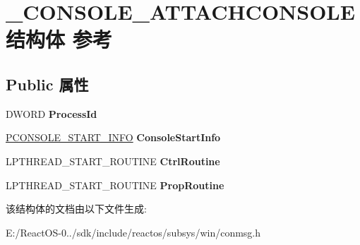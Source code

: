 \hypertarget{struct___c_o_n_s_o_l_e___a_t_t_a_c_h_c_o_n_s_o_l_e}{}\section{\+\_\+\+C\+O\+N\+S\+O\+L\+E\+\_\+\+A\+T\+T\+A\+C\+H\+C\+O\+N\+S\+O\+L\+E结构体 参考}
\label{struct___c_o_n_s_o_l_e___a_t_t_a_c_h_c_o_n_s_o_l_e}
\subsection*{Public 属性}
\begin{DoxyCompactItemize}
\item 
\mbox{\label{struct___c_o_n_s_o_l_e___a_t_t_a_c_h_c_o_n_s_o_l_e_a23c3387a096326a098b841b0dace6e54}} 
D\+W\+O\+RD {\bfseries Process\+Id}
\item 
\mbox{\label{struct___c_o_n_s_o_l_e___a_t_t_a_c_h_c_o_n_s_o_l_e_af6cd38d8953ae66032acd2c049c85659}} 
\hyperlink{struct___c_o_n_s_o_l_e___s_t_a_r_t___i_n_f_o}{P\+C\+O\+N\+S\+O\+L\+E\+\_\+\+S\+T\+A\+R\+T\+\_\+\+I\+N\+FO} {\bfseries Console\+Start\+Info}
\item 
\mbox{\label{struct___c_o_n_s_o_l_e___a_t_t_a_c_h_c_o_n_s_o_l_e_a8b13027dd88bb3e2c3939025f6ad155e}} 
L\+P\+T\+H\+R\+E\+A\+D\+\_\+\+S\+T\+A\+R\+T\+\_\+\+R\+O\+U\+T\+I\+NE {\bfseries Ctrl\+Routine}
\item 
\mbox{\label{struct___c_o_n_s_o_l_e___a_t_t_a_c_h_c_o_n_s_o_l_e_ab4e4e5f13a8c75d13f10ce46eb82d909}} 
L\+P\+T\+H\+R\+E\+A\+D\+\_\+\+S\+T\+A\+R\+T\+\_\+\+R\+O\+U\+T\+I\+NE {\bfseries Prop\+Routine}
\end{DoxyCompactItemize}


该结构体的文档由以下文件生成\+:\begin{DoxyCompactItemize}
\item 
E\+:/\+React\+O\+S-\/0../sdk/include/reactos/subsys/win/conmsg.\+h\end{DoxyCompactItemize}
